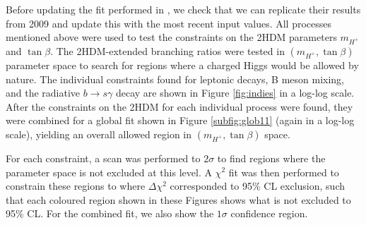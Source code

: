 \documentclass[a4paper,12pt]{article}
\begin{document}
Before updating the fit performed in \cite{desc}, we check that we can replicate their results from 2009 and update this with the most recent input values. 
All processes mentioned above were used to test the constraints on the 2HDM parameters $m_{H^+}$ and $\tan\beta$. 
The 2HDM-extended branching ratios were tested in $(m_{H^+},\tan\beta)$ parameter space to search for regions where a charged Higgs would be allowed by nature. 
The individual constraints found for leptonic decays, B meson mixing, and the radiative $b\to s\gamma$ decay are shown in Figure \ref{fig:indies} in a log-log scale.
After the constraints on the 2HDM for each individual process were found, they were combined for a global fit shown in Figure \ref{subfig:glob11} (again in a log-log scale), yielding an overall allowed region in $(m_{H^+},\tan\beta)$ space. 

For each constraint, a scan was performed to $2\sigma$ to find regions where the parameter space is not excluded at this level. 
A $\chi^2$ fit was then performed to constrain these regions to where $\Delta\chi^2$ corresponded to 95\% CL exclusion, such that each coloured region shown in these Figures shows what is not excluded to 95\% CL.
For the combined fit, we also show the $1\sigma$ confidence region. 
\end{document}
